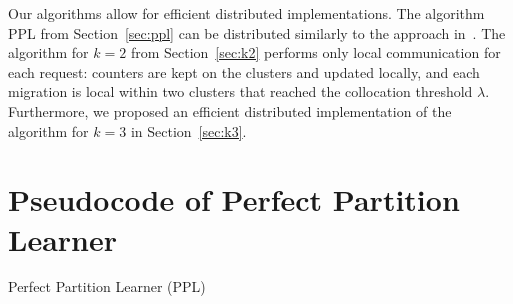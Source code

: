 \documentclass[a4paper,anonymous,USenglish]{lipics-v2019}
\newcommand{\PPL}{\textsc{PPL}\xspace}
\DeclarePairedDelimiter\set{\{}{\}}
\begin{document}
Our algorithms allow for efficient distributed implementations. 
The algorithm PPL from Section~\ref{sec:ppl} can be distributed
similarly to the approach in~\cite{sigmetrics19_partitioning}.
The algorithm for $k=2$ from Section~\ref{sec:k2} performs only local communication for each request: counters are kept on the clusters and updated locally, and each migration is local within two clusters that reached the collocation threshold $\lambda$.
Furthermore, we proposed an efficient distributed implementation of the algorithm for $k=3$ in Section~\ref{sec:k3}.




\appendix

\section{Pseudocode of Perfect Partition Learner}

\begin{algorithm}
	\renewcommand{\algorithmicrequire}{\textbf{Input:}}
	\renewcommand{\algorithmicensure}{\textbf{Output:}}
	\begin{algorithmic}
		\label{line:initcomponents}
		 \label{line:mergecomponents}
		\label{line:rebalance} 
		\ENDIF
		\ENDIF
		\ENDFOR
	\end{algorithmic}
	\caption{Perfect Partition Learner (\PPL)}
	\label{alg:ppl}
\end{algorithm}

\end{document}

